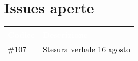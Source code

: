 \documentclass{classes/base}
\begin{document}
    \section*{Issues aperte}
    {
        
        \newlength{\freewidth}
        \setlength{\freewidth}{\dimexpr\textwidth-10\tabcolsep}
        \renewcommand{\arraystretch}{1.5}
        \centering
        \setlength{\aboverulesep}{0pt}
        \setlength{\belowrulesep}{0pt}
        \begin{longtable}{C{.13\freewidth} C{\freewidth}}
            \toprule
        \textcolor{white}{\textbf{Codice}}&
        \textcolor{white}{\textbf{Descrizione}}\\	
        \toprule
        \endhead
        
        \#107 & Stesura verbale 16 agosto \\

        \bottomrule
        \end{longtable}
    }
\end{document}
